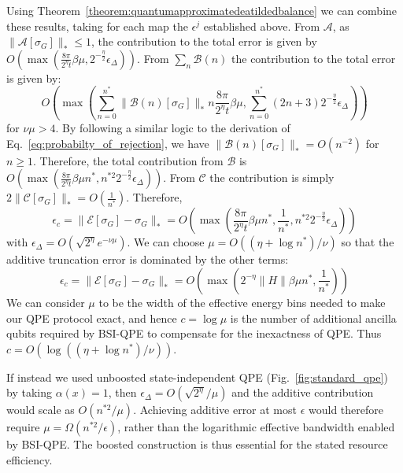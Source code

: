 \documentclass[aps,floatfix,10pt,amssymb,amsfont,amsmath,superscriptaddress,float,nofootinbib,longbibliography,nobalancelastpage,twocolumn]{revtex4-2}
\begin{document}
\begin{widetext}
Using Theorem~\ref{theorem:quantumapproximatedeatildedbalance} we can combine these results, taking for each map the $\epsilon^j$ established above. From $\mathcal{A}$, as $\|\mathcal{A}[\sigma_G]\|_* \leq 1$, the contribution to the total error is given by $O(\max(\frac{8\pi}{2^{\eta}t}\beta\mu,2^{-\frac{\eta}{2}}\epsilon_{\Delta}))$. From $\sum_n\mathcal{B}(n)$ the contribution to the total error is given by:
\begin{equation}
    O\!\left(\max\!\left(\sum_{n=0}^{n^*}\|\mathcal B(n)[\sigma_G]\|_* n\frac{8\pi}{2^{\eta}t}\beta \mu,
    \sum_{n=0}^{n^*}(2n+3)2^{-\frac{\eta}{2}}\epsilon_{\Delta}\right)\right)
\end{equation}
for $\nu \mu > 4$. By following a similar logic to the derivation of Eq.~\eqref{eq:probabilty_of_rejection}, we have $\|\mathcal B(n)[\sigma_G]\|_* = O(n^{-2})$ for $n\geq1$. Therefore, the total contribution from $\mathcal{B}$ is $O(\!\max(\frac{8\pi}{2^{\eta}t}\beta \mu n^*,n^{*2}2^{-\frac{\eta}{2}}\epsilon_{\Delta}))$. From $\mathcal{C}$ the contribution is simply $2\|\mathcal{C}[\sigma_G]\|_* = O(\frac{1}{n^*})$. Therefore,
 \begin{equation}
   \epsilon_c = \|\mathcal{E}[\sigma_G] - \sigma_G\|_* = O\left(\max\left( \frac{8\pi}{2^{\eta}t}\beta\mu n^* ,\frac{1}{n^*}, n^{*2}2^{-\frac{\eta}{2}}\epsilon_{\Delta}\right)\right)
\end{equation}
with $\epsilon_{\Delta}=O(\sqrt{2^{\eta}}e^{-\nu\mu})$. We can choose $\mu = O((\eta+\log n^*)/\nu)$ so that the additive truncation error is dominated by the other terms:
 \begin{equation}
   \epsilon_c = \|\mathcal{E}[\sigma_G] - \sigma_G\|_* = O\left(\max\left( 2^{-\eta}\|H\|\beta\mu n^* ,\frac{1}{n^*}\right)\right)
    \label{eq:error_bound}
\end{equation}
We can consider $\mu$ to be the width of the effective energy bins needed to make our QPE protocol exact, and hence $c=\log\mu$ is the number of additional ancilla qubits required by BSI-QPE to compensate for the inexactness of QPE. Thus $c=O(\log((\eta+\log n^*)/\nu))$.

If instead we used unboosted state-independent QPE (Fig.~\ref{fig:standard_qpe}) by taking $\alpha(x)=1$, then $\epsilon_{\Delta}=O(\sqrt{2^{\eta}}/\mu)$ and the additive contribution would scale as $O(n^{*2}/\mu)$. Achieving additive error at most $\epsilon$ would therefore require $\mu=\Omega(n^{*2}/\epsilon)$, rather than the logarithmic effective bandwidth enabled by BSI-QPE. The boosted construction is thus essential for the stated resource efficiency.
\end{widetext}
\end{document}
